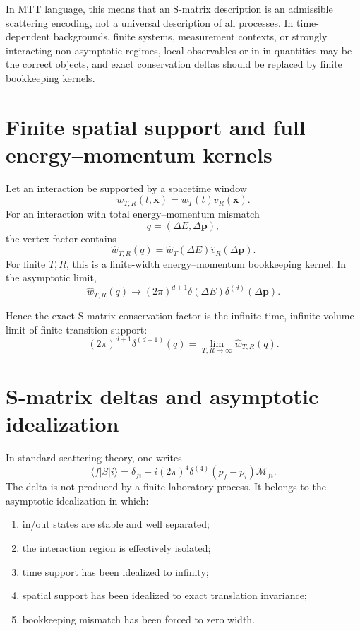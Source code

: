 \documentclass[11pt]{article}
\begin{document}
In MTT language, this means that an S-matrix description is an admissible scattering encoding, not a universal description of all processes.  In time-dependent backgrounds, finite systems, measurement contexts, or strongly interacting non-asymptotic regimes, local observables or in-in quantities may be the correct objects, and exact conservation deltas should be replaced by finite bookkeeping kernels.


\section{Finite spatial support and full energy--momentum kernels}

Let an interaction be supported by a spacetime window
\[
w_{T,R}(t,\mathbf x)
=
w_T(t)v_R(\mathbf x).
\]
For an interaction with total energy--momentum mismatch
\[
q=(\Delta E,\Delta \mathbf p),
\]
the vertex factor contains
\[
\widehat w_{T,R}(q)
=
\widehat w_T(\Delta E)\widehat v_R(\Delta \mathbf p).
\]
For finite \(T,R\), this is a finite-width energy--momentum bookkeeping kernel.  In the asymptotic limit,
\[
\widehat w_{T,R}(q)
\to
(2\pi)^{d+1}\delta(\Delta E)\delta^{(d)}(\Delta\mathbf p).
\]

Hence the exact S-matrix conservation factor is the infinite-time, infinite-volume limit of finite transition support:
\[
(2\pi)^{d+1}\delta^{(d+1)}(q)
=
\lim_{T,R\to\infty}\widehat w_{T,R}(q).
\]

\section{S-matrix deltas and asymptotic idealization}

In standard scattering theory, one writes
\[
\langle f|S|i\rangle
=
\delta_{fi}
+
i(2\pi)^4\delta^{(4)}(p_f-p_i)\mathcal M_{fi}.
\]
The delta is not produced by a finite laboratory process.  It belongs to the asymptotic idealization in which:

\begin{enumerate}
\item in/out states are stable and well separated;
\item the interaction region is effectively isolated;
\item time support has been idealized to infinity;
\item spatial support has been idealized to exact translation invariance;
\item bookkeeping mismatch has been forced to zero width.
\end{enumerate}
\end{document}
